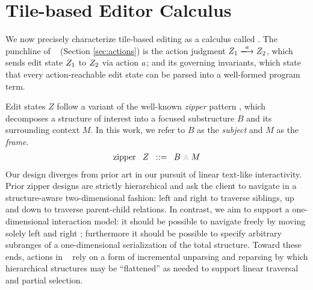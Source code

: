 
\section{Tile-based Editor Calculus}\label{sec:formalism}

We now precisely characterize tile-based editing
as a calculus called \ty.
The punchline of \ty~ (Section \ref{sec:actions})
is the action judgment
$\performAction{\editState_1}{\action}{\editState_2}$,
which sends edit state $Z_1$ to $Z_2$
via action $a$; and its governing invariants,
which state that every action-reachable edit state
can be parsed into a well-formed program term.

Edit states $Z$ follow a variant of the well-known \emph{zipper}
pattern \cite{zipper}, which decomposes a structure of interest
into a focused substructure $B$ and its surrounding context $M$.
In this work, we refer to $B$ as the \emph{subject}
and $M$ as the \emph{frame}.
\[
\arraycolsep=4pt
\begin{array}{rlrl}
  \text{zipper} & \zip & ::= & \zipper{\subject}{\zframe}
\end{array}
\]
Our design diverges from prior art in our pursuit
of linear text-like interactivity.
Prior zipper designs are strictly hierarchical and ask
the client to navigate in a structure-aware two-dimensional
fashion: left and right to traverse siblings,
up and down to traverse parent-child relations.
In contrast, we aim to support a one-dimensional interaction
model:
it should be possible to navigate freely by moving solely
left and right ;
furthermore it should be possible to specify
arbitrary subranges of a one-dimensional serialization
of the total structure.
Toward these ends, actions in \ty~ rely
on a form of incremental unparsing and reparsing by which
hierarchical structures may be ``flattened'' as needed
to support linear traversal and partial selection.

